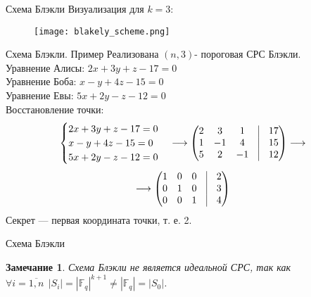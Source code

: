 \documentclass{beamer}
\newtheorem{Note}{Замечание}
\begin{document}
\begin{frame}{Схема Блэкли}
    Визуализация для \(k = 3\):
    \begin{figure}
    \centering
    \texttt{[image: blakely\_scheme.png]}
\end{figure}
\end{frame}

\begin{frame}{Схема Блэкли. Пример}
    Реализована \((n, 3)\)- пороговая СРС Блэкли. \\
    Уравнение Алисы: \(2x + 3y + z - 17 = 0\) \\
    Уравнение Боба: \(x - y + 4z - 15 = 0\) \\
    Уравнение Евы: \(5x + 2y - z - 12 = 0\) \\
    Восстановление точки: \[
    \begin{cases}
        2x + 3y + z - 17 = 0 \\
        x - y + 4z - 15 = 0 \\
        5x + 2y - z - 12 = 0
    \end{cases} \longrightarrow \begin{pmatrix}
        2 & 3 & 1 & \vline & 17 \\
        1 & -1 & 4 & \vline & 15 \\
        5 & 2 & -1 & \vline & 12
    \end{pmatrix} \longrightarrow 
    \]
    \[
    \longrightarrow \begin{pmatrix}
        1 & 0 & 0 & \vline & 2 \\
        0 & 1 & 0 & \vline & 3 \\
        0 & 0 & 1 & \vline & 4
    \end{pmatrix}
    \]
    Секрет --- первая координата точки, т. е. 2.
\end{frame}

\begin{frame}{Схема Блэкли}
    \begin{Note}
        Схема Блэкли не является идеальной СРС, так как \(\forall i = \overline{1, n} \ \ |S_i| = |\mathbb{F}_q|^{k + 1} \neq |\mathbb{F}_q| = |S_0|\).
    \end{Note}
\end{frame}
\end{document}
